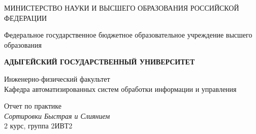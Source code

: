 \documentclass[a4paper, 12pt]{article}
\begin{document}
\rmfamily

\begin{center}

МИНИСТЕРСТВО НАУКИ И ВЫСШЕГО
ОБРАЗОВАНИЯ РОССИЙСКОЙ ФЕДЕРАЦИИ
\end{center}
\begin{center}
    Федеральное государственное бюджетное образовательное учреждение 
высшего образования 
\end{center}
\begin{center}
\textbf{АДЫГЕЙСКИЙ ГОСУДАРСТВЕННЫЙ УНИВЕРСИТЕТ }
\end{center}
\begin{center}
    Инженерно-физический факультет \\
     Кафедра автоматизированных систем обработки информации и 
управления 
\end{center}
\par\bigskip
\par\bigskip
\par\bigskip
\begin{center}
  {\large Отчет по практике }\\
{\it {\large Сортировки Быстрая и Слиянием}} \\
{\small2 курс, группа 2ИВТ2 }\par\bigskip
\end{center}
\par\bigskip
\end{document}
